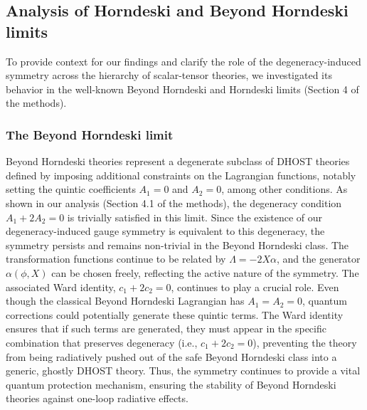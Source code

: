 \documentclass[twocolumn]{aastex631}
\begin{document}
\subsection{Analysis of Horndeski and Beyond Horndeski limits}
To provide context for our findings and clarify the role of the degeneracy-induced symmetry across the hierarchy of scalar-tensor theories, we investigated its behavior in the well-known Beyond Horndeski and Horndeski limits (Section 4 of the methods).

\subsubsection{The Beyond Horndeski limit}
Beyond Horndeski theories represent a degenerate subclass of DHOST theories defined by imposing additional constraints on the Lagrangian functions, notably setting the quintic coefficients $A_1=0$ and $A_2=0$, among other conditions. As shown in our analysis (Section 4.1 of the methods), the degeneracy condition $A_1 + 2A_2 = 0$ is trivially satisfied in this limit. Since the existence of our degeneracy-induced gauge symmetry is equivalent to this degeneracy, the symmetry persists and remains non-trivial in the Beyond Horndeski class. The transformation functions continue to be related by $\Lambda = -2X\alpha$, and the generator $\alpha(\phi, X)$ can be chosen freely, reflecting the active nature of the symmetry.
The associated Ward identity, $c_1 + 2c_2 = 0$, continues to play a crucial role. Even though the classical Beyond Horndeski Lagrangian has $A_1=A_2=0$, quantum corrections could potentially generate these quintic terms. The Ward identity ensures that if such terms are generated, they must appear in the specific combination that preserves degeneracy (i.e., $c_1 + 2c_2 = 0$), preventing the theory from being radiatively pushed out of the safe Beyond Horndeski class into a generic, ghostly DHOST theory. Thus, the symmetry continues to provide a vital quantum protection mechanism, ensuring the stability of Beyond Horndeski theories against one-loop radiative effects.
\end{document}
